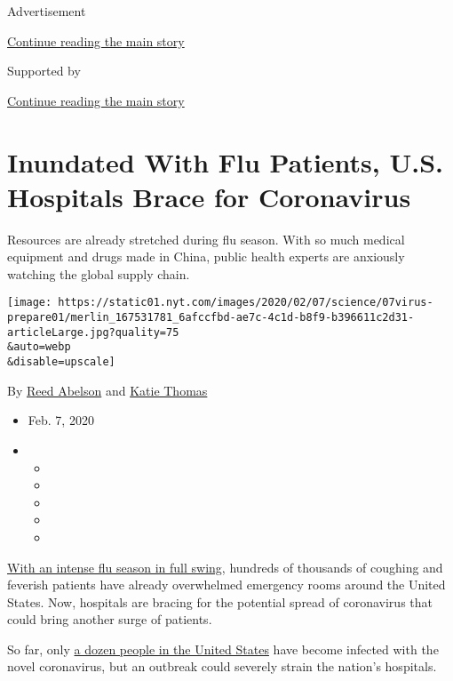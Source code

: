 Advertisement

\protect\hyperlink{after-top}{Continue reading the main story}

Supported by

\protect\hyperlink{after-sponsor}{Continue reading the main story}

\hypertarget{inundated-with-flu-patients-us-hospitals-brace-for-coronavirus}{%
\section{Inundated With Flu Patients, U.S. Hospitals Brace for
Coronavirus}\label{inundated-with-flu-patients-us-hospitals-brace-for-coronavirus}}

Resources are already stretched during flu season. With so much medical
equipment and drugs made in China, public health experts are anxiously
watching the global supply chain.

\texttt{[image: https://static01.nyt.com/images/2020/02/07/science/07virus-prepare01/merlin\_167531781\_6afccfbd-ae7c-4c1d-b8f9-b396611c2d31-articleLarge.jpg?quality=75\\\&auto=webp\\\&disable=upscale]}

By \href{https://www.nytimes.com/by/reed-abelson}{Reed Abelson} and
\href{https://www.nytimes.com/by/katie-thomas}{Katie Thomas}

\begin{itemize}
\item
  Feb. 7, 2020
\item
  \begin{itemize}
  \item
  \item
  \item
  \item
  \item
  \end{itemize}
\end{itemize}

\href{https://www.nytimes.com/2020/01/08/health/flu-season-severity.html}{With
an intense flu season in full swing}, hundreds of thousands of coughing
and feverish patients have already overwhelmed emergency rooms around
the United States. Now, hospitals are bracing for the potential spread
of coronavirus that could bring another surge of patients.

So far, only
\href{https://www.cdc.gov/coronavirus/2019-ncov/cases-in-us.html}{a
dozen people in the United States} have become infected with the novel
coronavirus, but an outbreak could severely strain the nation's
hospitals.

